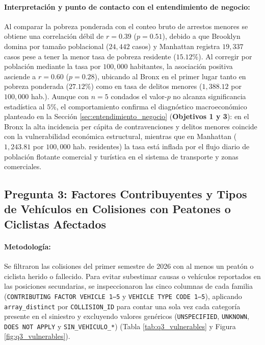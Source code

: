 \paragraph{Interpretación y punto de contacto con el entendimiento de negocio:}
Al comparar la pobreza ponderada con el conteo bruto de arrestos menores se obtiene una correlación débil de $r = 0.39$ ($p = 0.51$), debido a que Brooklyn domina por tamaño poblacional ($24,442$ casos) y Manhattan registra $19,337$ casos pese a tener la menor tasa de pobreza residente ($15.12\%$). Al corregir por población mediante la tasa por $100,000$ habitantes, la asociación positiva asciende a $r = 0.60$ ($p = 0.28$), ubicando al Bronx en el primer lugar tanto en pobreza ponderada ($27.12\%$) como en tasa de delitos menores ($1,388.12$ por $100,000$ hab.). Aunque con $n = 5$ condados el valor-$p$ no alcanza significancia estadística al $5\%$, el comportamiento confirma el diagnóstico macroeconómico planteado en la Sección \ref{sec:entendimiento_negocio} (\textbf{Objetivos 1 y 3}): en el Bronx la alta incidencia per cápita de contravenciones y delitos menores coincide con la vulnerabilidad económica estructural, mientras que en Manhattan ($1,243.81$ por $100,000$ hab. residentes) la tasa está inflada por el flujo diario de población flotante comercial y turística en el sistema de transporte y zonas comerciales.

\subsection{Pregunta 3: Factores Contribuyentes y Tipos de Vehículos en Colisiones con Peatones o Ciclistas Afectados}
\label{subsec:respuesta_q3}

\paragraph{Metodología:} Se filtraron las colisiones del primer semestre de 2026 con al menos un peatón o ciclista herido o fallecido. Para evitar subestimar causas o vehículos reportados en las posiciones secundarias, se inspeccionaron las cinco columnas de cada familia (\texttt{CONTRIBUTING FACTOR VEHICLE 1--5} y \texttt{VEHICLE TYPE CODE 1--5}), aplicando \texttt{array\_distinct} por \texttt{COLLISION\_ID} para contar una sola vez cada categoría presente en el siniestro y excluyendo valores genéricos (\texttt{UNSPECIFIED}, \texttt{UNKNOWN}, \texttt{DOES NOT APPLY} y \texttt{SIN\_VEHICULO\_*}) (Tabla \ref{tab:q3_vulnerables} y Figura \ref{fig:q3_vulnerables}).

